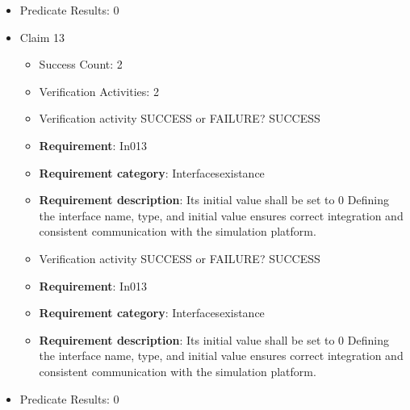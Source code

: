 \documentclass{article}
\begin{document}
\begin{itemize}
\begin{itemize}
					\item Verification activity SUCCESS or FAILURE? SUCCESS
		
						\item \textbf{Requirement}: In012 
						\item \textbf{Requirement category}: Interfacesexistance 
						\item \textbf{Requirement description}: Its initial value shall be set to 0 Defining the interface name, type, and initial value ensures correct integration and consistent communication with the simulation platform.
					
				\end{itemize}
				
									    
				\item Predicate Results: 0

  				  \item Claim 13
				\begin{itemize}
			    	\item Success Count: 2 
			    	\item Verification Activities: 2
					\item Verification activity SUCCESS or FAILURE? SUCCESS
		
						\item \textbf{Requirement}: In013 
						\item \textbf{Requirement category}: Interfacesexistance 
						\item \textbf{Requirement description}: Its initial value shall be set to 0 Defining the interface name, type, and initial value ensures correct integration and consistent communication with the simulation platform.
					
					\item Verification activity SUCCESS or FAILURE? SUCCESS
		
						\item \textbf{Requirement}: In013 
						\item \textbf{Requirement category}: Interfacesexistance 
						\item \textbf{Requirement description}: Its initial value shall be set to 0 Defining the interface name, type, and initial value ensures correct integration and consistent communication with the simulation platform.
					
				\end{itemize}
				
									    
				\item Predicate Results: 0


\end{itemize}
\end{document}
